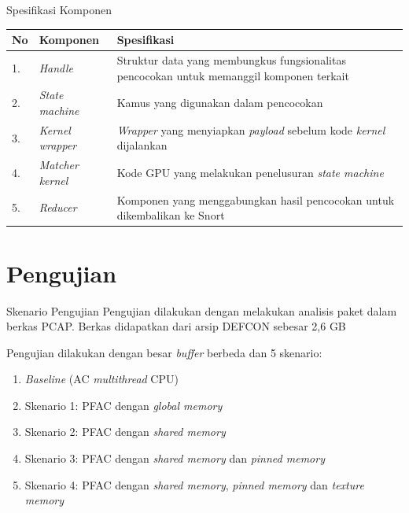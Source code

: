 \documentclass[10pt,xcolor=table]{beamer}
\begin{document}
\begin{frame}{Spesifikasi Komponen}
    \begin{table}
    \begin{tabular}{@{} llp{7cm} @{}}
        \toprule
        No & Komponen & Spesifikasi\\
        \midrule
        1. & \emph{Handle} & Struktur data yang membungkus fungsionalitas pencocokan untuk memanggil komponen terkait\\
        2. & \emph{State machine} & Kamus yang digunakan dalam pencocokan\\
        3. & \emph{Kernel wrapper} & \emph{Wrapper} yang menyiapkan \emph{payload} sebelum kode \emph{kernel} dijalankan\\
        4. & \emph{Matcher kernel} & Kode GPU yang melakukan penelusuran \emph{state machine}\\
        5. & \emph{Reducer} & Komponen yang menggabungkan hasil pencocokan untuk dikembalikan ke Snort\\
        \bottomrule
    \end{tabular}
    \end{table}
\end{frame}

\section{Pengujian}

\begin{frame}{Skenario Pengujian}
    Pengujian dilakukan dengan melakukan analisis paket dalam berkas PCAP. Berkas didapatkan dari arsip DEFCON sebesar 2,6 GB

    Pengujian dilakukan dengan besar \emph{buffer} berbeda dan 5 skenario:
    \begin{enumerate}
        \item \emph{Baseline} (AC \emph{multithread} CPU)
        \item Skenario 1: PFAC dengan \emph{global memory}
        \item Skenario 2: PFAC dengan \emph{shared memory}
        \item Skenario 3: PFAC dengan \emph{shared memory} dan \emph{pinned memory}
        \item Skenario 4: PFAC dengan \emph{shared memory}, \emph{pinned memory} dan \emph{texture memory}
    \end{enumerate}
\end{frame}
\end{document}
